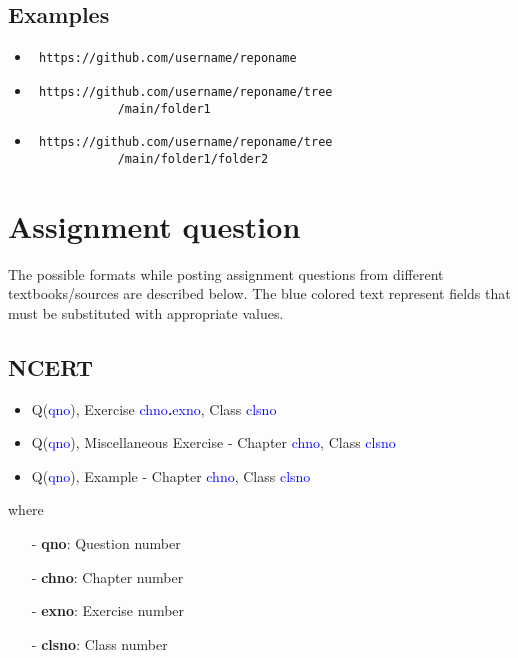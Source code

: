\documentclass[journal,10pt,twocolumn]{article}
\providecommand{\textblue}[1]{\textcolor{blue}{#1}}
\begin{document}
	\subsection{\normalsize Examples}
		\begin{itemize}
			\item \begin{verbatim} https://github.com/username/reponame \end{verbatim}
			\item \begin{verbatim} https://github.com/username/reponame/tree
			/main/folder1 \end{verbatim}
			\item \begin{verbatim} https://github.com/username/reponame/tree
			/main/folder1/folder2 \end{verbatim}
		\end{itemize}

\section{\large Assignment question}
The possible formats while posting assignment questions from different textbooks/sources are described below. The blue colored text represent fields that must be substituted with appropriate values.
	\subsection{\normalsize NCERT}
		\begin{itemize}
			\item Q(\textblue{qno}), Exercise \textblue{chno}\textbf{.}\textblue{exno}, Class \textblue{clsno}
			\item Q(\textblue{qno}), Miscellaneous Exercise - Chapter \textblue{chno}, Class \textblue{clsno}
			\item Q(\textblue{qno}), Example - Chapter \textblue{chno}, Class \textblue{clsno}
		\end{itemize}
		where
		\begin{itemize}
			\item[-] \textbf{qno}: Question number
			\item[-] \textbf{chno}: Chapter number
			\item[-] \textbf{exno}: Exercise number
			\item[-] \textbf{clsno}: Class number
		\end{itemize}
\end{document}
